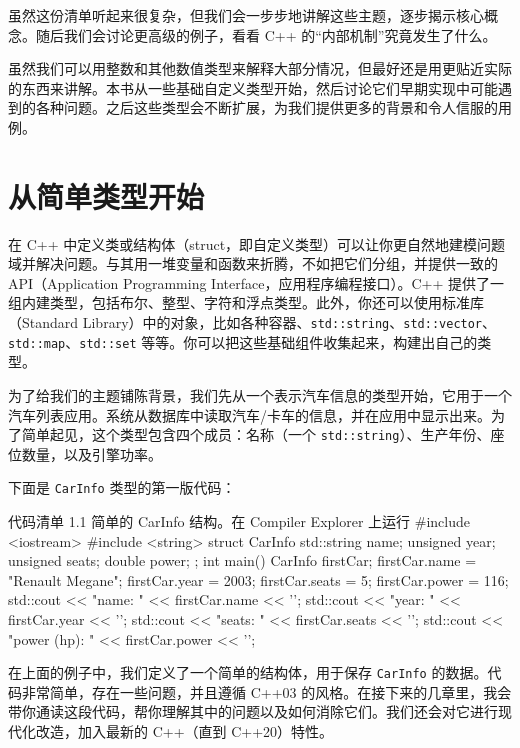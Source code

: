 虽然这份清单听起来很复杂，但我们会一步步地讲解这些主题，逐步揭示核心概念。随后我们会讨论更高级的例子，看看 C++ 的“内部机制”究竟发生了什么。

虽然我们可以用整数和其他数值类型来解释大部分情况，但最好还是用更贴近实际的东西来讲解。本书从一些基础自定义类型开始，然后讨论它们早期实现中可能遇到的各种问题。之后这些类型会不断扩展，为我们提供更多的背景和令人信服的用例。

\section{从简单类型开始}

在 C++ 中定义类或结构体（struct，即自定义类型）可以让你更自然地建模问题域并解决问题。与其用一堆变量和函数来折腾，不如把它们分组，并提供一致的 API（Application Programming Interface，应用程序编程接口）。C++ 提供了一组内建类型，包括布尔、整型、字符和浮点类型。此外，你还可以使用标准库（Standard Library）中的对象，比如各种容器、\texttt{std::string}、\texttt{std::vector}、\texttt{std::map}、\texttt{std::set} 等等。你可以把这些基础组件收集起来，构建出自己的类型。

为了给我们的主题铺陈背景，我们先从一个表示汽车信息的类型开始，它用于一个汽车列表应用。系统从数据库中读取汽车/卡车的信息，并在应用中显示出来。为了简单起见，这个类型包含四个成员：名称（一个 \texttt{std::string}）、生产年份、座位数量，以及引擎功率。

下面是 \texttt{CarInfo} 类型的第一版代码：

\begin{codeboxt}[cpp]{代码清单 1.1 简单的 CarInfo 结构。在 Compiler Explorer 上运行}
#include <iostream>
#include <string>
struct CarInfo {
std::string name;
unsigned year;
unsigned seats;
double power;
};
int main() {
CarInfo firstCar;
firstCar.name = "Renault Megane";
firstCar.year = 2003;
firstCar.seats = 5;
firstCar.power = 116;
std::cout << "name: " << firstCar.name << '\n';
std::cout << "year: " << firstCar.year << '\n';
std::cout << "seats: " << firstCar.seats << '\n';
std::cout << "power (hp): " << firstCar.power << '\n';
}
\end{codeboxt}


在上面的例子中，我们定义了一个简单的结构体，用于保存 \texttt{CarInfo} 的数据。代码非常简单，存在一些问题，并且遵循 C++03 的风格。在接下来的几章里，我会带你通读这段代码，帮你理解其中的问题以及如何消除它们。我们还会对它进行现代化改造，加入最新的 C++（直到 C++20）特性。

